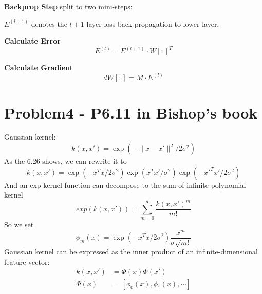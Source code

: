 \documentclass[12pt]{article}
\begin{document}
\textbf{Backprop Step} split to two mini-steps:

	$E^{(l+1)}$ denotes the $l+1$ layer loss back propagation to lower layer.
	
	\textbf{Calculate Error}
	\begin{equation}
		E^{(l)} = E^{(l+1)} \cdot W[:]^T
	\end{equation}

	\textbf{Calculate Gradient}
	\begin{equation}
		dW[:] = M \cdot E^{(l)}
	\end{equation}

\section{Problem4 - P6.11 in Bishop's book}
Gaussian kernel:
\begin{equation}
	k(x,x') = \exp(-\|x-x'\|^2/2\sigma^2)
\end{equation}
As the 6.26 shows, we can rewrite it to
\begin{equation}
	k(x,x') = \exp(-x^T x/2\sigma^2) \exp(x^T x'/\sigma^2) \exp(-x'^T x'/2\sigma^2)
\end{equation}
And an exp kernel function can decompose to the sum of infinite polynomial kernel
\begin{equation}
	exp(k(x,x')) = \sum_{m=0}^{\infty} \frac{k(x,x')^m}{m!}
\end{equation}
So we set
\begin{equation}
	\phi_m(x) = \exp(-x^Tx/2\sigma^2) \frac{x^m}{\sigma \sqrt{m!}}
\end{equation}
Gaussian kernel can be expressed as the inner product of an infinite-dimensional feature vector:
\begin{equation}
	\begin{split}
		k(x,x') &= \Phi(x)\Phi(x')\\
		\Phi(x) &= [\phi_0(x), \phi_1(x), \cdots ]
	\end{split}
\end{equation}
\end{document}
